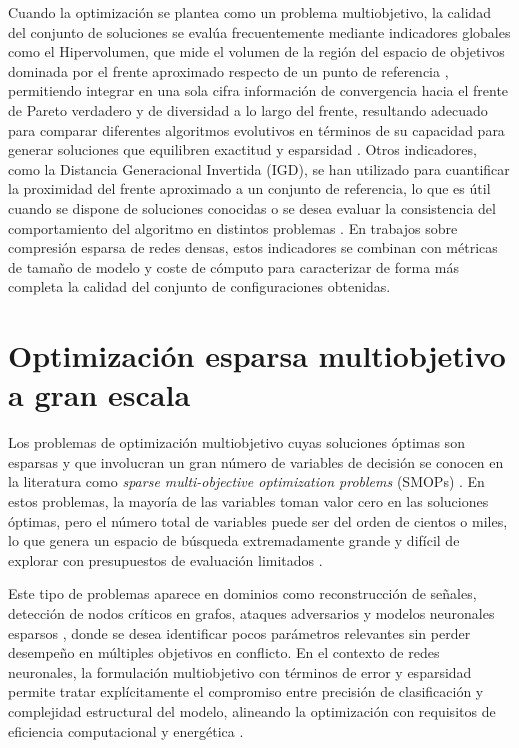Cuando la optimización se plantea como un problema multiobjetivo, la calidad del conjunto de soluciones se evalúa frecuentemente mediante indicadores globales como el Hipervolumen, que mide el volumen de la región del espacio de objetivos dominada por el frente aproximado respecto de un punto de referencia \cite{Jin2007evo-multi-snn, dimovska2020multiobjectiveoptimizationsizeresilience}, permitiendo integrar en una sola cifra información de convergencia hacia el frente de Pareto verdadero y de diversidad a lo largo del frente, resultando adecuado para comparar diferentes algoritmos evolutivos en términos de su capacidad para generar soluciones que equilibren exactitud y esparsidad \cite{Zitzler2007HV_revisited}. Otros indicadores, como la Distancia Generacional Invertida (IGD), se han utilizado para cuantificar la proximidad del frente aproximado a un conjunto de referencia, lo que es útil cuando se dispone de soluciones conocidas o se desea evaluar la consistencia del comportamiento del algoritmo en distintos problemas \cite{dimovska2020multiobjectiveoptimizationsizeresilience}. En trabajos sobre compresión esparsa de redes densas, estos indicadores se combinan con métricas de tamaño de modelo y coste de cómputo para caracterizar de forma más completa la calidad del conjunto de configuraciones obtenidas.


\section{Optimización esparsa multiobjetivo a gran escala}
Los problemas de optimización multiobjetivo cuyas soluciones óptimas son esparsas y que involucran un gran número de variables de decisión se conocen en la literatura como \textit{sparse multi-objective optimization problems} (SMOPs) \cite{Shao2025_SMOEA, Tian2020AnEALSMOP}. En estos problemas, la mayoría de las variables toman valor cero en las soluciones óptimas, pero el número total de variables puede ser del orden de cientos o miles, lo que genera un espacio de búsqueda extremadamente grande y difícil de explorar con presupuestos de evaluación limitados \cite{Tian2020AnEALSMOP, ZOU2025-sparse-LSMOEA, Shao2025_SMOEA}.

Este tipo de problemas aparece en dominios como reconstrucción de señales, detección de nodos críticos en grafos, ataques adversarios y modelos neuronales esparsos \cite{Shao2026AnEA-LSMOP, ZOU2025-sparse-LSMOEA, Shao2025_SMOEA}, donde se desea identificar pocos parámetros relevantes sin perder desempeño en múltiples objetivos en conflicto. En el contexto de redes neuronales, la formulación multiobjetivo con términos de error y esparsidad permite tratar explícitamente el compromiso entre precisión de clasificación y complejidad estructural del modelo, alineando la optimización con requisitos de eficiencia computacional y energética \cite{Hotegni2024moo-sparse, REINERS2022sparse}.

